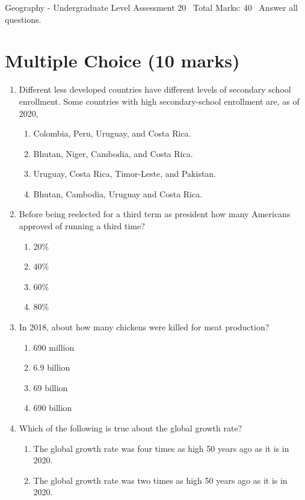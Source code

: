 \documentclass[12pt]{article}
\begin{document}
\begin{center}
Geography - Undergraduate Level Assessment 20 \
Total Marks: 40 \
Answer all questions.
\end{center}

\section*{Multiple Choice (10 marks)}
\begin{enumerate}[label=\arabic*.]
\item Different less developed countries have different levels of secondary school enrollment. Some countries with high secondary-school enrollment are, as of 2020,
\begin{enumerate}[label=(\alph*)]
    \item Colombia, Peru, Uruguay, and Costa Rica.
    \item Bhutan, Niger, Cambodia, and Costa Rica.
    \item Uruguay, Costa Rica, Timor-Leste, and Pakistan.
    \item Bhutan, Cambodia, Uruguay and Costa Rica.
\end{enumerate}
\item Before being reelected for a third term as president how many Americans approved of running a third time?
\begin{enumerate}[label=(\alph*)]
    \item 20\%
    \item 40\%
    \item 60\%
    \item 80\%
\end{enumerate}
\item In 2018, about how many chickens were killed for meat production?
\begin{enumerate}[label=(\alph*)]
    \item 690 million
    \item 6.9 billion
    \item 69 billion
    \item 690 billion
\end{enumerate}
\item Which of the following is true about the global growth rate?
\begin{enumerate}[label=(\alph*)]
    \item The global growth rate was four times as high 50 years ago as it is in 2020.
    \item The global growth rate was two times as high 50 years ago as it is in 2020.

\end{enumerate}
\end{enumerate}
\end{document}
